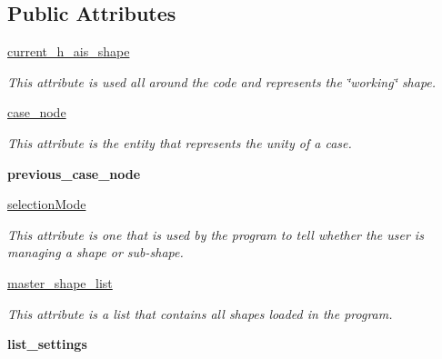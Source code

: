 \subsection*{Public Attributes}
\begin{DoxyCompactItemize}
\item 
\hyperlink{a00079_a84a62c3017515ec840e35dbbe8ccbf21}{current\+\_\+h\+\_\+ais\+\_\+shape}
\begin{DoxyCompactList}\small\item\em This attribute is used all around the code and represents the \char`\"{}working\char`\"{} shape. \end{DoxyCompactList}\item 
\hypertarget{a00079_a76f4a1191b8d68c0ed9d9f3e1e6756d8}{}\label{a00079_a76f4a1191b8d68c0ed9d9f3e1e6756d8} 
\hyperlink{a00079_a76f4a1191b8d68c0ed9d9f3e1e6756d8}{case\+\_\+node}
\begin{DoxyCompactList}\small\item\em This attribute is the entity that represents the unity of a case. \end{DoxyCompactList}\item 
\hypertarget{a00079_a43d75821c1883b1b972c8e0ef9922b4a}{}\label{a00079_a43d75821c1883b1b972c8e0ef9922b4a} 
{\bfseries previous\+\_\+case\+\_\+node}
\item 
\hypertarget{a00079_a84adec7b4b982bce58747d39e098236f}{}\label{a00079_a84adec7b4b982bce58747d39e098236f} 
\hyperlink{a00079_a84adec7b4b982bce58747d39e098236f}{selection\+Mode}
\begin{DoxyCompactList}\small\item\em This attribute is one that is used by the program to tell whether the user is managing a shape or sub-\/shape. \end{DoxyCompactList}\item 
\hypertarget{a00079_a819ef9e1cd2f233d92a5379532060bd0}{}\label{a00079_a819ef9e1cd2f233d92a5379532060bd0} 
\hyperlink{a00079_a819ef9e1cd2f233d92a5379532060bd0}{master\+\_\+shape\+\_\+list}
\begin{DoxyCompactList}\small\item\em This attribute is a list that contains all shapes loaded in the program. \end{DoxyCompactList}\item 
\hypertarget{a00079_a96038d8a4727208ba2e9cd359bcd4781}{}\label{a00079_a96038d8a4727208ba2e9cd359bcd4781} 
{\bfseries list\+\_\+settings}
\item 
\hypertarget{a00079_abfb58254f95f980e2821bac01114cd40}{}\label{a00079_abfb58254f95f980e2821bac01114cd40} 

\end{DoxyCompactItemize}
